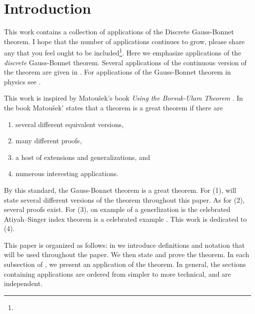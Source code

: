 \section{Introduction}
\label{sec:intro}

This work contains a collection of applications of the 
Discrete Gauss-Bonnet theorem.
I hope that the number of applications continues to grow,
please share any that you feel
ought to  be included\footnote{}.
Here we emphasize applications of the \emph{discrete} Gauss-Bonnet
theorem. 
Several applications of the continuous version of the theorem
are given in \cite{doc76}.
For applications of the Gauss-Bonnet theorem in physics see \cite{tirado-physics-apps}.

This work is inspired by Matou\v{s}ek's book \emph{Using the Borsuk-Ulam Theorem}
\cite{jm08}.
In the book Matou\v{s}ek' states that a theorem is a great theorem if there are
\begin{enumerate}[(1)]
\item several different equivalent versions,
\item many different proofs,
\item a host of extensions and generalizations, and
\item numerous interesting applications.
\end{enumerate}

By this standard, the Gauss-Bonnet theorem is a great theorem.
For (1), will state several different versions of the theorem throughout this paper.
As for (2), several proofs exist.
For (3), on example of a generlization is the celebrated Atiyah–Singer index 
theorem is a celebrated example \cite{atiyah_index_1963}.
This work is dedicated to (4).

This paper is organized as follows:
in  we introduce definitions and notation that will be used
throughout the paper. We then state and prove the theorem.
In each subsection of , we present an application of the theorem.
In general, the sections containing applications are ordered from simpler to more technical,
and are independent.



